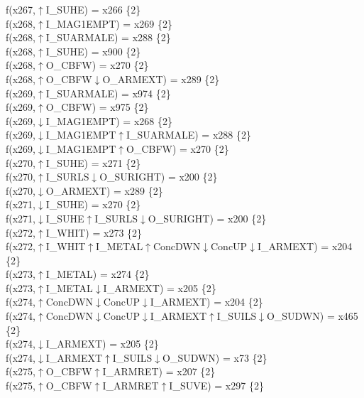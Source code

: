 f(x267,$\uparrow$I\_SUHE) = x266 \{2\} \\  
f(x268,$\uparrow$I\_MAG1EMPT) = x269 \{2\} \\  
f(x268,$\uparrow$I\_SUARMALE) = x288 \{2\} \\  
f(x268,$\uparrow$I\_SUHE) = x900 \{2\} \\  
f(x268,$\uparrow$O\_CBFW) = x270 \{2\} \\  
f(x268,$\uparrow$O\_CBFW$\downarrow$O\_ARMEXT) = x289 \{2\} \\  
f(x269,$\uparrow$I\_SUARMALE) = x974 \{2\} \\  
f(x269,$\uparrow$O\_CBFW) = x975 \{2\} \\  
f(x269,$\downarrow$I\_MAG1EMPT) = x268 \{2\} \\  
f(x269,$\downarrow$I\_MAG1EMPT$\uparrow$I\_SUARMALE) = x288 \{2\} \\  
f(x269,$\downarrow$I\_MAG1EMPT$\uparrow$O\_CBFW) = x270 \{2\} \\  
f(x270,$\uparrow$I\_SUHE) = x271 \{2\} \\  
f(x270,$\uparrow$I\_SURLS$\downarrow$O\_SURIGHT) = x200 \{2\} \\  
f(x270,$\downarrow$O\_ARMEXT) = x289 \{2\} \\  
f(x271,$\downarrow$I\_SUHE) = x270 \{2\} \\  
f(x271,$\downarrow$I\_SUHE$\uparrow$I\_SURLS$\downarrow$O\_SURIGHT) = x200 \{2\} \\  
f(x272,$\uparrow$I\_WHIT) = x273 \{2\} \\  
f(x272,$\uparrow$I\_WHIT$\uparrow$I\_METAL$\uparrow$ConcDWN$\downarrow$ConcUP$\downarrow$I\_ARMEXT) = x204 \{2\} \\  
f(x273,$\uparrow$I\_METAL) = x274 \{2\} \\  
f(x273,$\uparrow$I\_METAL$\downarrow$I\_ARMEXT) = x205 \{2\} \\  
f(x274,$\uparrow$ConcDWN$\downarrow$ConcUP$\downarrow$I\_ARMEXT) = x204 \{2\} \\  
f(x274,$\uparrow$ConcDWN$\downarrow$ConcUP$\downarrow$I\_ARMEXT$\uparrow$I\_SUILS$\downarrow$O\_SUDWN) = x465 \{2\} \\  
f(x274,$\downarrow$I\_ARMEXT) = x205 \{2\} \\  
f(x274,$\downarrow$I\_ARMEXT$\uparrow$I\_SUILS$\downarrow$O\_SUDWN) = x73 \{2\} \\  
f(x275,$\uparrow$O\_CBFW$\uparrow$I\_ARMRET) = x207 \{2\} \\  
f(x275,$\uparrow$O\_CBFW$\uparrow$I\_ARMRET$\uparrow$I\_SUVE) = x297 \{2\} \\  
